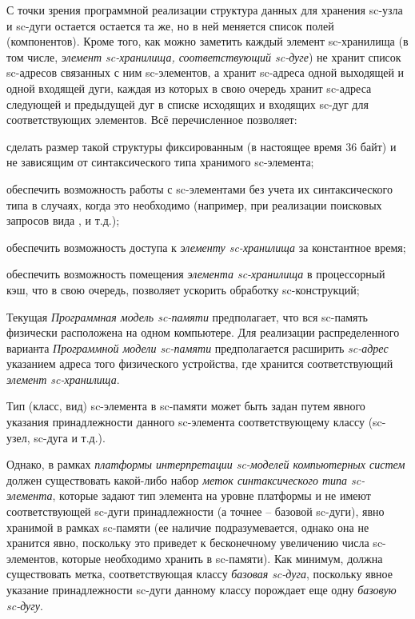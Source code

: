 С точки зрения программной реализации структура данных для хранения sc-узла и sc-дуги остается остается та же, но в
ней меняется список полей (компонентов).
Кроме того, как можно заметить каждый элемент sc-хранилища (в том числе, \textit{элемент sc-хранилища, соответствующий
sc-дуге}) не хранит список sc-адресов связанных с ним sc-элементов, а хранит sc-адреса одной выходящей и одной
входящей дуги, каждая из которых в свою очередь хранит sc-адреса следующей и предыдущей дуг в списке исходящих и
входящих sc-дуг для соответствующих элементов. Всё перечисленное позволяет:
\begin{scnitemize}
    \item сделать размер такой структуры фиксированным (в настоящее время 36 байт) и не зависящим от синтаксического
    типа хранимого sc-элемента;
    \item обеспечить возможность работы с sc-элементами без учета их синтаксического типа в случаях, когда это необходимо
    (например, при реализации поисковых запросов вида ,
     и т.д.);
    \item обеспечить возможность доступа к \textit{элементу sc-хранилища} за константное время;
    \item обеспечить возможность помещения \textit{элемента sc-хранилища} в процессорный кэш, что в свою очередь,
    позволяет ускорить обработку sc-конструкций;
\end{scnitemize}

Текущая \textit{Программная модель sc-памяти} предполагает, что вся sc-память физически расположена на одном компьютере.
Для реализации распределенного варианта \textit{Программной модели sc-памяти} предполагается расширить \textit{sc-адрес}
указанием адреса того физического устройства, где хранится соответствующий \textit{элемент sc-хранилища}.

Тип (класс, вид) sc-элемента в sc-памяти может быть задан путем явного указания принадлежности данного sc-элемента
соответствующему классу (sc-узел, sc-дуга и т.д.).

Однако, в рамках \textit{платформы интерпретации sc-моделей компьютерных систем} должен существовать какой-либо набор
\textit{меток синтаксического типа sc-элемента}, которые задают тип элемента на уровне платформы и не имеют соответствующей
sc-дуги принадлежности (а точнее -- базовой sc-дуги), явно хранимой в рамках sc-памяти (ее наличие подразумевается,
однако она не хранится явно, поскольку это приведет к бесконечному увеличению числа sc-элементов, которые необходимо
хранить в sc-памяти). Как минимум, должна существовать метка, соответствующая классу \textit{базовая sc-дуга}, поскольку
явное указание принадлежности sc-дуги данному классу порождает еще одну \textit{базовую sc-дугу}.

